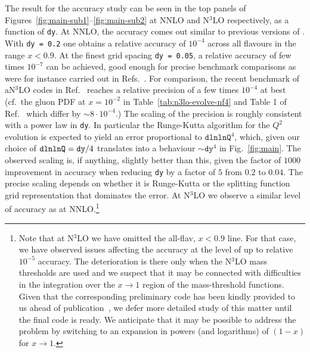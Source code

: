 The result for the accuracy study can be seen in the top panels of
Figures~\ref{fig:main-sub1}--\ref{fig:main-sub2} at NNLO and N$^3$LO
respectively, as a function of \texttt{dy}.
%
At NNLO, the accuracy comes out similar to previous
versions of \hoppet.
%
With \texttt{dy =
  0.2} one obtains a relative accuracy of $10^{-4}$ across all
flavours in the range $x < 0.9$.
%
At the finest grid spacing \texttt{dy = 0.05}, a relative accuracy of
few times $10^{-7}$ can be achieved, good enough for precise benchmark
comparisons as were for instance carried out in
Refs.~\cite{Dittmar:2005ed,Bertone:2024dpm}.
%
For comparison,
the recent benchmark of aN$^3$LO codes in
Ref.~\cite{Cooper-Sarkar:2024crx} reaches a relative precision of a
few times $10^{-4}$ at best (cf.\ the gluon PDF at $x = 10^{-2}$ in
Table~\ref{tab:n3lo-evolve-nf4} and Table 1 of
Ref.~\cite{Cooper-Sarkar:2024crx} which differ by $\sim 8\cdot 10^{-4}$.)
%
The scaling of the precision is roughly consistent with a power law in
\texttt{dy}.
%
In particular the Runge-Kutta algorithm for the $Q^2$ evolution is
expected to yield an error proportional to $\texttt{dlnlnQ}^4$, which,
given our choice of $\texttt{dlnlnQ} = \texttt{dy}/4$
translates into a behaviour $\sim \texttt{dy}^4$ in
Fig.~\ref{fig:main}.
%
The observed scaling is, if anything, slightly better than this, given
the factor of $1000$ improvement in accuracy when reducing \texttt{dy}
by a factor of $5$ from $0.2$ to $0.04$.
%
The precise scaling depends on whether it is Runge-Kutta or the
splitting function grid representation that dominates the error.
%
At N$^3$LO we observe a similar level of accuracy as at
NNLO.\footnote{Note that at N$^3$LO we have omitted the 
  all-flav, $x<0.9$ line.
  For that case, we have observed issues affecting the accuracy at the
  level of up to relative $10^{-5}$ accuracy.
  The deterioration is there only when the N$^3$LO mass thresholds are
  used and we suspect that it may be connected with difficulties in the
  integration over the $x \to 1$ region of the mass-threshold
  functions.
  Given that the corresponding preliminary code has been kindly
  provided to us ahead of publication~\cite{BlumleinCode}, we defer
  more detailed study of this matter until the final code is ready.
  We anticipate that it may be possible to address the problem by
  switching to an expansion in powers (and logarithms) of $(1-x)$ for
  $x \to 1$.  }




